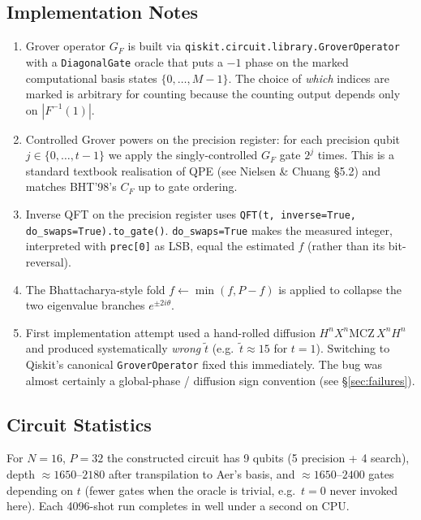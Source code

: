 \documentclass[11pt]{article}
\begin{document}
\subsection{Implementation Notes}
\begin{enumerate}
\item Grover operator $G_F$ is built via \texttt{qiskit.circuit.library.GroverOperator}
      with a \texttt{DiagonalGate} oracle that puts a $-1$ phase on
      the marked computational basis states $\{0,\ldots,M-1\}$. The choice
      of \emph{which} indices are marked is arbitrary for counting because
      the counting output depends only on $|F^{-1}(1)|$.
\item Controlled Grover powers on the precision register: for each
      precision qubit $j \in \{0,\ldots,t-1\}$ we apply the singly-controlled
      $G_F$ gate $2^j$ times. This is a standard textbook realisation of
      QPE (see Nielsen \& Chuang \S5.2) and matches BHT'98's $C_F$
      up to gate ordering.
\item Inverse QFT on the precision register uses
      \texttt{QFT(t, inverse=True, do\_swaps=True).to\_gate()}.
      \texttt{do\_swaps=True} makes the measured integer, interpreted with
      \texttt{prec[0]} as LSB, equal the estimated $f$ (rather than its
      bit-reversal).
\item The Bhattacharya-style fold $f \gets \min(f, P-f)$ is applied to
      collapse the two eigenvalue branches $e^{\pm 2i\theta}$.
\item First implementation attempt used a hand-rolled diffusion
      $H^n X^n \mathrm{MCZ}\, X^n H^n$ and produced systematically
      \emph{wrong} $\tilde t$ (e.g.\ $\tilde t \approx 15$ for $t=1$).
      Switching to Qiskit's canonical \texttt{GroverOperator} fixed this
      immediately. The bug was almost certainly a global-phase / diffusion
      sign convention (see \S\ref{sec:failures}).
\end{enumerate}

\subsection{Circuit Statistics}
For $N=16$, $P=32$ the constructed circuit has 9 qubits (5 precision
+ 4 search), depth $\approx 1650$--$2180$ after transpilation to Aer's
basis, and $\approx 1650$--$2400$ gates depending on $t$ (fewer gates when the
oracle is trivial, e.g.\ $t=0$ never invoked here). Each 4096-shot run
completes in well under a second on CPU.
\end{document}
